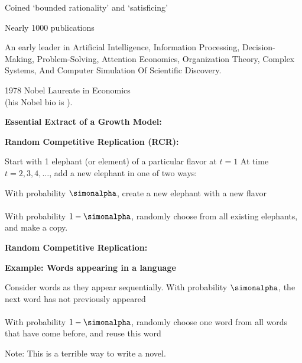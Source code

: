     Coined `bounded rationality' and `satisficing'
   
    Nearly 1000 publications
   
    An early leader in
    Artificial Intelligence, Information Processing,
    Decision-Making, Problem-Solving, Attention Economics, Organization
    Theory, Complex Systems, And Computer Simulation Of Scientific
    Discovery. 
   
    1978 Nobel Laureate in Economics\\
    (his Nobel bio is ).
  
  



  \textbf{Essential Extract of a Growth Model:}

  \textbf{Random Competitive Replication (RCR):}
    
     Start with 1 elephant (or element) of a particular flavor at $t=1$
     At time $t=2,3,4,\ldots$, add a new elephant in
      one of two ways:
      
       With probability $\simonalpha$, create a new elephant
        with a new flavor\\
        {}\\
        \bigskip
       With probability $1-\simonalpha$, randomly choose
        from all existing elephants, and make a copy.\\
        {}
        \bigskip
      
    
  


  \textbf{Random Competitive Replication:}
  
  \textbf{Example: Words appearing in a language}
    
     Consider words as they appear sequentially.
     With probability $\simonalpha$, the next word
      has not previously appeared\\
      {}\\
      \bigskip
     With probability $1-\simonalpha$, randomly choose
      one word from all words that have come before, and reuse this word\\
      {}
    
  

  
    Note: This is a terrible way to write a novel.
  


